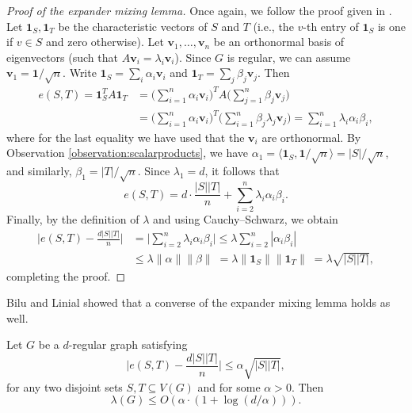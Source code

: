 \begin{proof}[Proof of the expander mixing lemma]
    Once again, we follow the proof given in \cite{expandergraphs}.
    Let $\bm{1}_S, \bm{1}_T$ be the characteristic vectors of $S$ and $T$ (i.e., the $v$-th entry of $\bm{1}_S$ is one if $v \in S$ and zero otherwise).
    Let $\bm{v}_1, \dots, \bm{v}_n$ be an orthonormal basis of eigenvectors (such that $A \bm{v}_i = \lambda_i \bm{v}_i$).
    Since $G$ is regular, we can assume $\bm{v}_1 = \bm{1} / \sqrt{n}$.
    Write $\bm{1}_S = \sum_i \alpha_i \bm{v}_i$ and $\bm{1}_T = \sum_j \beta_j \bm{v}_j$. Then
    \begin{align*}
        e(S, T) = \bm{1}_S ^T A \bm{1}_T 
                &= \Bigg( \sum \limits_{i = 1}^n \alpha_i \bm{v}_i \Bigg)^T A \Bigg( \sum \limits_{j = 1}^n \beta_j \bm{v}_j \Bigg) \\
                &= \Bigg( \sum \limits_{i = 1}^n \alpha_i \bm{v}_i \Bigg)^T \Bigg(\sum \limits_{i = 1}^n \beta_j \lambda_j \bm{v}_j \Bigg) 
                = \sum \limits_{i = 1}^n \lambda_i \alpha_i \beta_i,
    \end{align*}
    where for the last equality we have used that the $\bm{v}_i$ are orthonormal. 
    By Observation \ref{observation:scalarproducts}, we have \mbox{$\alpha_1 = \langle \bm{1}_S, {\bm{1}}/{\sqrt{n}} \rangle = {|S|}/{\sqrt{n}}$}, and similarly, $\beta_1 = {|T|}/{\sqrt{n}}$.
    Since $\lambda_1 = d$, it follows that
    \begin{equation*}
        e(S, T) = d \cdot \frac{|S||T|}{n} + \sum \limits_{i = 2}^n \lambda_i \alpha_i \beta_i.
    \end{equation*}
    Finally, by the definition of $\lambda$ and using Cauchy--Schwarz, we obtain
    \begin{align*}
        \bigg| e(S, T) - \frac{d |S||T|}{n} \bigg| &= \bigg|  \sum \limits_{i = 2}^n \lambda_i \alpha_i \beta_i \bigg|  
            \le \lambda \sum \limits_{i = 2}^n |\alpha_i \beta_i| \\
            &\le \lambda \| \alpha \| \| \beta \| \; = \lambda \| \bm{1}_S \| \| \bm{1}_T \|\; = \lambda \sqrt{|S| |T|},
    \end{align*}
    completing the proof.
\end{proof}

Bilu and Linial \cite{bilulinial} showed that a converse of the expander mixing lemma holds as well.
\begin{lemma}
    Let $G$ be a $d$-regular graph satisfying 
    \begin{equation*}
        \bigg| e(S, T) - \frac{d |S||T|}{n} \bigg| \le \alpha \sqrt{|S| |T|},
    \end{equation*}
    for any two disjoint sets $S, T \subseteq V(G)$ and for some $\alpha > 0$.
    Then 
    \begin{equation*}
        \lambda(G) \le O (\alpha \cdot (1 + \log (d / \alpha))).
    \end{equation*}
\end{lemma}
